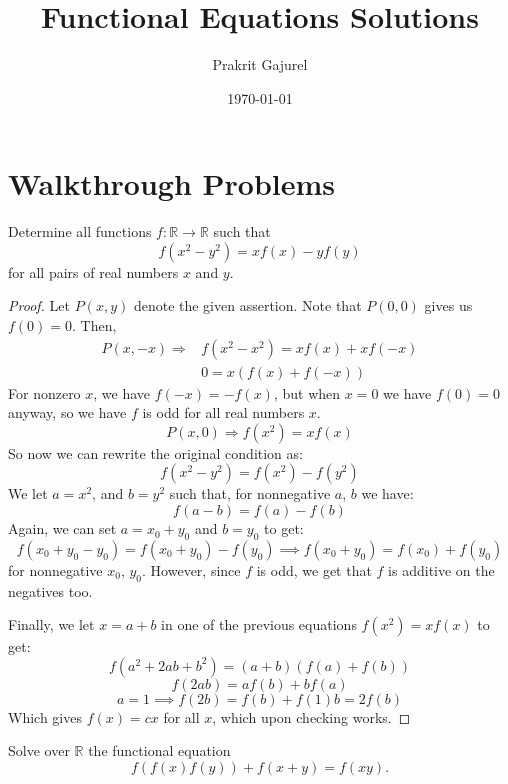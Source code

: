 \documentclass[11pt]{scrartcl}
\begin{document}
\title{Functional Equations Solutions}
\author{Prakrit Gajurel}
\date{\today}
\maketitle

\section{Walkthrough Problems}

\begin{problem}
    [USAMO 2002]
    Determine all functions $f: \mathbb{R} \rightarrow \mathbb{R}$ such that
    \[
    f(x^2-y^2) = xf(x) - yf(y)
    \]
    for all pairs of real numbers $x$ and $y$.
    
\end{problem}

\begin{proof}
    Let $P(x, y)$ denote the given assertion. Note that $P(0,0)$ gives us $f(0)=0$. Then,
    \begin{align*}
        P(x, -x) \Longrightarrow &f(x^2-x^2) = xf(x) + xf(-x)
        \\& 0 = x(f(x)+f(-x))
    \end{align*}
    For nonzero $x$, we have $f(-x) = -f(x)$, but when $x=0$ we have $f(0)=0$ anyway, so we have $f$ is odd for all real numbers $x$.
    \[
    P(x,0) \Longrightarrow f(x^2) = xf(x)
    \]
    So now we can rewrite the original condition as:
    \[
    f(x^2 - y^2) = f(x^2) - f(y^2)
    \]
    We let $a = x^2$, and $b = y^2$ such that, for nonnegative $a$, $b$ we have:
    \[
    f(a-b) = f(a) - f(b)
    \]
    Again, we can set $a=x_0 + y_0$ and $b=y_0$ to get:
    \[
    f(x_0+y_0-y_0) = f(x_0+y_0) - f(y_0) \implies f(x_0 + y_0) = f(x_0) + f(y_0)
    \]
    for nonnegative $x_0$, $y_0$. However, since $f$ is odd, we get that $f$ is additive on the negatives too.

    Finally, we let $x=a+b$ in one of the previous equations $f(x^2) = xf(x)$ to get:
    \[
    f(a^2 + 2ab + b^2) = (a+b)(f(a) + f(b))
    \]
    \[
      f(2ab) = af(b) + bf(a)
    \]
    \[
      a = 1 \implies f(2b) = f(b) + f(1)b = 2f(b)
    \]
    Which gives $f(x) = cx$ for all $x$, which upon checking works.
\end{proof}
\newpage
\begin{problem}
  [IMO 2017]
  Solve over $\mathbb{R}$ the functional equation
  \[
  f(f(x)f(y)) + f(x+y) = f(xy).
  \]
\end{problem}
\end{document}
